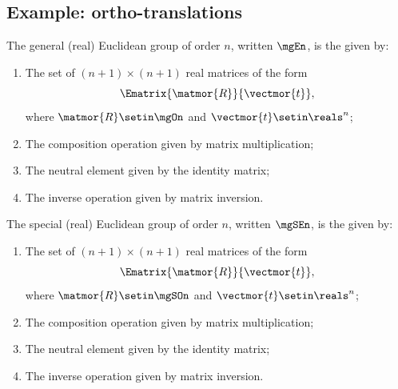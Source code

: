 \subsection{Example: ortho-translations}

\begin{definition}
    \label{def:general-euclidean-group}
    The general (real) Euclidean group of order $n$, written $\mgEn$,
    is the  given by:

    \constit
    \begin{enumerate}
        \item The set of $(n+1) \times (n+1)$ real matrices of the form
              \begin{equation}
                  \label{eq:En-def}
                  \Ematrix{\matmor{R}}{\vectmor{t}},
              \end{equation}
              where $\matmor{R}\setin \mgOn$ and $\vectmor{t} \setin \reals^n$;
        \item The composition operation given by matrix multiplication;
        \item The neutral element given by the identity matrix;
        \item The inverse operation given by matrix inversion.
    \end{enumerate}
\end{definition}

\begin{definition}
    \label{def:special-euclidean-group}
    The special (real) Euclidean group of order $n$, written $\mgSEn$,
    is the  given by:

    \constit
    \begin{enumerate}
        \item The set of $(n+1) \times (n+1)$ real matrices of the form
              \begin{equation}
                  \label{eq:SEn-def}
                  \Ematrix{\matmor{R}}{\vectmor{t}},
              \end{equation}
              where $\matmor{R}\setin \mgSOn$ and $\vectmor{t} \setin \reals^n$;
        \item The composition operation given by matrix multiplication;
        \item The neutral element given by the identity matrix;
        \item The inverse operation given by matrix inversion.
    \end{enumerate}
\end{definition}

